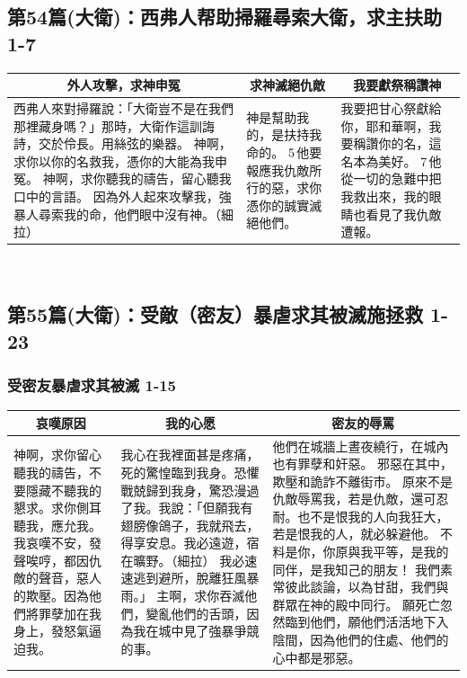 \subsection{第54篇(大衛)：西弗人帮助掃羅尋索大衛，求主扶助 1-7}
\begin{table}[H]
\centering
\begin{tabular}{p{8.5cm}|p{3.500cm}|p{4.2500cm}}\hline\hline
\multicolumn{1}{c|}{外人攻擊，求神申冤}&\multicolumn{1}{c|}{求神滅絕仇敵}&\multicolumn{1}{c}{我要獻祭稱讚神}\\\hline
西弗人來對掃羅說：「大衛豈不是在我們那裡藏身嗎？」那時，大衛作這訓誨詩，交於伶長。用絲弦的樂器。
神啊，求你以你的名救我，憑你的大能為我申冤。
神啊，求你聽我的禱告，留心聽我口中的言語。
因為外人起來攻擊我，強暴人尋索我的命，他們眼中沒有神。（細拉）
&神是幫助我的，是扶持我命的。
5 他要報應我仇敵所行的惡，求你憑你的誠實滅絕他們。
&我要把甘心祭獻給你，耶和華啊，我要稱讚你的名，這名本為美好。
7 他從一切的急難中把我救出來，我的眼睛也看見了我仇敵遭報。\\\hline
\end{tabular}
\end{table} 

\subsection{第55篇(大衛)：受敵（密友）暴虐求其被滅施拯救 1-23}
\subsubsection{受密友暴虐求其被滅 1-15}
\begin{table}[H]
\centering
\begin{tabular}{p{3.5cm}|p{5.500cm}|p{7.7500cm}}\hline\hline
\multicolumn{1}{c|}{哀嘆原因}&\multicolumn{1}{c|}{我的心愿}&\multicolumn{1}{c}{密友的辱罵}\\\hline
神啊，求你留心聽我的禱告，不要隱藏不聽我的懇求。求你側耳聽我，應允我。我哀嘆不安，發聲唉哼，都因仇敵的聲音，惡人的欺壓。因為他們將罪孽加在我身上，發怒氣逼迫我。
&我心在我裡面甚是疼痛，死的驚惶臨到我身。恐懼戰兢歸到我身，驚恐漫過了我。我說：「但願我有翅膀像鴿子，我就飛去，得享安息。我必遠遊，宿在曠野。（細拉）
我必速速逃到避所，脫離狂風暴雨。」
主啊，求你吞滅他們，變亂他們的舌頭，因為我在城中見了強暴爭競的事。
&他們在城牆上晝夜繞行，在城內也有罪孽和奸惡。
邪惡在其中，欺壓和詭詐不離街市。
原來不是仇敵辱罵我，若是仇敵，還可忍耐。也不是恨我的人向我狂大，若是恨我的人，就必躲避他。
不料是你，你原與我平等，是我的同伴，是我知己的朋友！
我們素常彼此談論，以為甘甜，我們與群眾在神的殿中同行。
願死亡忽然臨到他們，願他們活活地下入陰間，因為他們的住處、他們的心中都是邪惡。\\\hline
\end{tabular}
\end{table} 

